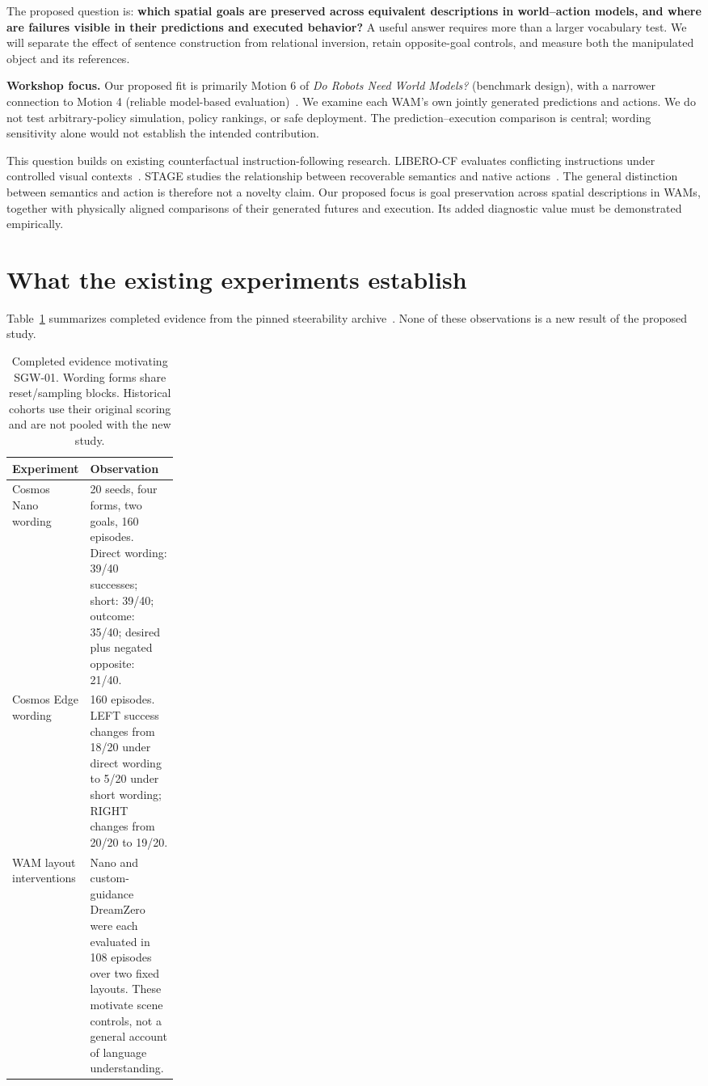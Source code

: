 \documentclass[11pt]{article}
\begin{document}
The proposed question is: \textbf{which spatial goals are preserved across equivalent descriptions in world--action models, and where are failures visible in their predictions and executed behavior?} A useful answer requires more than a larger vocabulary test. We will separate the effect of sentence construction from relational inversion, retain opposite-goal controls, and measure both the manipulated object and its references.

\textbf{Workshop focus.} Our proposed fit is primarily Motion 6 of \emph{Do Robots Need World Models?} (benchmark design), with a narrower connection to Motion 4 (reliable model-based evaluation)~\cite{workshop}. We examine each WAM's own jointly generated predictions and actions. We do not test arbitrary-policy simulation, policy rankings, or safe deployment. The prediction--execution comparison is central; wording sensitivity alone would not establish the intended contribution.

This question builds on existing counterfactual instruction-following research. LIBERO-CF evaluates conflicting instructions under controlled visual contexts~\cite{liberocf}. STAGE studies the relationship between recoverable semantics and native actions~\cite{stage}. The general distinction between semantics and action is therefore not a novelty claim. Our proposed focus is goal preservation across spatial descriptions in WAMs, together with physically aligned comparisons of their generated futures and execution. Its added diagnostic value must be demonstrated empirically.

\section{What the existing experiments establish}
Table~\ref{tab:existing} summarizes completed evidence from the pinned steerability archive~\cite{archive}. None of these observations is a new result of the proposed study.

\begin{table}[ht]
\centering\small
\caption{Completed evidence motivating SGW-01. Wording forms share reset/sampling blocks. Historical cohorts use their original scoring and are not pooled with the new study.}
\label{tab:existing}
\begin{tabularx}{\linewidth}{@{}p{0.24\linewidth}X@{}}
\toprule
Experiment & Observation \\
\midrule
Cosmos Nano wording & 20 seeds, four forms, two goals, 160 episodes. Direct wording: 39/40 successes; short: 39/40; outcome: 35/40; desired plus negated opposite: 21/40. \\
Cosmos Edge wording & 160 episodes. LEFT success changes from 18/20 under direct wording to 5/20 under short wording; RIGHT changes from 20/20 to 19/20. \\
WAM layout interventions & Nano and custom-guidance DreamZero were each evaluated in 108 episodes over two fixed layouts. These motivate scene controls, not a general account of language understanding. \\
\bottomrule
\end{tabularx}
\end{table}
\end{document}
